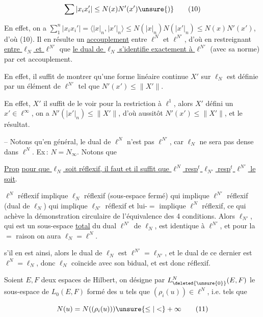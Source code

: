 
\[
\sum|x_i x_i'|\leq N(x)N'(x')\unsure{)}\tag*{(10)}
\]

En effet, on a $\sum_{1}^{n}|x_i x_i'|=\langle |x|_n,|x'|_n\rangle\leq N(|x|_n)N(|x'|_n)\leq N(x)N'(x')$\unsure{)}, d'où (10). Il en résulte un \uline{accouplement} entre $\ell^N$ et $\ell^{N'}$,  d'où en restreignant \uline{entre $\ell_N$ et $\ell^{N'}$}\unsure{;|,}   que \uline{le dual de $\ell_N$ s'identifie exactement à $\ell^{N'}$} (avec sa norme) par cet accouplement.

En effet,  il suffit de montrer qu'une forme linéaire continue $X'$ sur $\ell_N$ est définie par un  élément de $\ell^{N'}$  tel que $N'(x')\leq\lVert X'\rVert$.

En effet, $X'$  il suffit de le voir pour la  restriction à $\ell^1$, alors $X'$  défini   un $x'\in\ell^\infty$,  on a $N'(|x'|_n)\leq\lVert X'\rVert$, d'où aussitôt $N'(x')\leq\lVert X'\rVert$, et le résultat.

-- Notons qu'en général, le dual de $\ell^N$ n'est pas $\ell^{N'}$,  car $\ell_N$ ne sera pas dense dans $\ell^N$. Ex\,: $N=N_\infty$. Notons que

\uline{Prop} \uline{pour que $\ell_N$ soit réflexif, il faut et il suffit que $\ell^N$ resp$^t$ $\ell_{N'}$ resp$^t$ $\ell^{N'}$ le soit}.  

$\ell^N$ réflexif implique $\ell_N$ réflexif (sous-espace fermé) qui implique $\ell^{N'}$ réflexif (dual de $\ell_N$) qui  implique $\ell_{N'}$ réflexif et lui-$=$ implique $\ell^N$ réflexif, ce qui achève la démonstration  circulaire de l'équivalence des 4 conditions. Alors $\ell_{N'}$, qui est un sous-espace  \uline{total}  du dual $\ell^{N'}$ de $\ell_N$, est identique à $\ell^{N'}$, et pour la $=$ raison on aura $\ell_N=\ell^N$.


 s'il en est ainsi, alors le dual de $\ell_N$ est $\ell^{N'}=\ell_{N'}$, et le dual de ce dernier est $\ell^N=\ell_N$, donc $\ell_N$ coïncide avec son bidual, et est donc réflexif.

 Soient $E,F$ deux espaces de Hilbert,  on désigne par $L^N_{\deleted{\unsure{0}}}(E,F)$ le  sous-espace de $L_0(E,F)$ formé des $u$ tels que $(\rho_i(u))\in\ell^N$, i.e. tels que

\[
N(u)=N((\rho_i(u)))\unsure{\leq|<}+\infty\tag*{(11)}
\]

